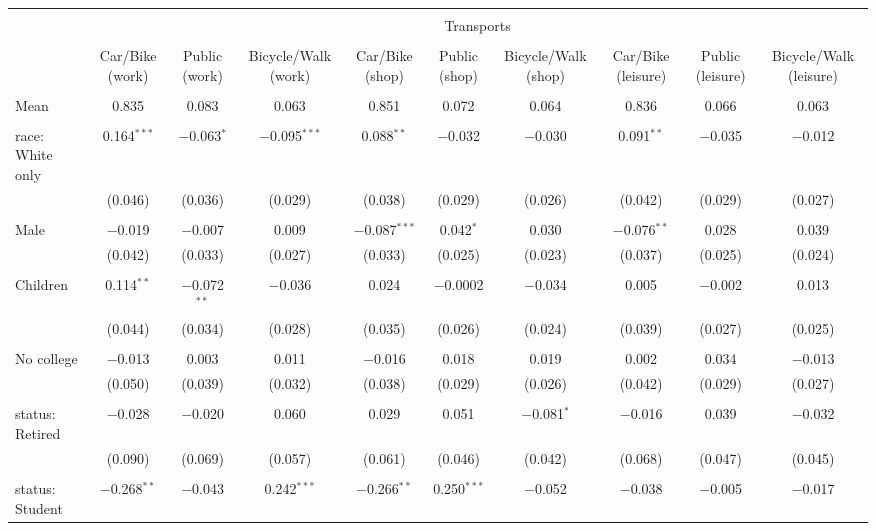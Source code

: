 
\begin{tabular}{@{\extracolsep{5pt}}lccccccccc} 
\\[-1.8ex]\hline 
\hline \\[-1.8ex] 
 & \multicolumn{9}{c}{Transports} \\ 
\cline{2-10} 
\\[-1.8ex] & Car/Bike (work) & Public (work) & Bicycle/Walk (work) & Car/Bike (shop) & Public (shop) & Bicycle/Walk (shop) & Car/Bike (leisure) & Public (leisure) & Bicycle/Walk (leisure) \\ 
\hline \\[-1.8ex] 
 Mean & 0.835 & 0.083 & 0.063 & 0.851 & 0.072 & 0.064 & 0.836 & 0.066 & 0.063  \\ \hline \\[-1.8ex] race: White only & 0.164$^{***}$ & $-$0.063$^{*}$ & $-$0.095$^{***}$ & 0.088$^{**}$ & $-$0.032 & $-$0.030 & 0.091$^{**}$ & $-$0.035 & $-$0.012 \\ 
  & (0.046) & (0.036) & (0.029) & (0.038) & (0.029) & (0.026) & (0.042) & (0.029) & (0.027) \\ 
  & & & & & & & & & \\ 
 Male & $-$0.019 & $-$0.007 & 0.009 & $-$0.087$^{***}$ & 0.042$^{*}$ & 0.030 & $-$0.076$^{**}$ & 0.028 & 0.039 \\ 
  & (0.042) & (0.033) & (0.027) & (0.033) & (0.025) & (0.023) & (0.037) & (0.025) & (0.024) \\ 
  & & & & & & & & & \\ 
 Children & 0.114$^{**}$ & $-$0.072$^{**}$ & $-$0.036 & 0.024 & $-$0.0002 & $-$0.034 & 0.005 & $-$0.002 & 0.013 \\ 
  & (0.044) & (0.034) & (0.028) & (0.035) & (0.026) & (0.024) & (0.039) & (0.027) & (0.025) \\ 
  & & & & & & & & & \\ 
 No college & $-$0.013 & 0.003 & 0.011 & $-$0.016 & 0.018 & 0.019 & 0.002 & 0.034 & $-$0.013 \\ 
  & (0.050) & (0.039) & (0.032) & (0.038) & (0.029) & (0.026) & (0.042) & (0.029) & (0.027) \\ 
  & & & & & & & & & \\ 
 status: Retired & $-$0.028 & $-$0.020 & 0.060 & 0.029 & 0.051 & $-$0.081$^{*}$ & $-$0.016 & 0.039 & $-$0.032 \\ 
  & (0.090) & (0.069) & (0.057) & (0.061) & (0.046) & (0.042) & (0.068) & (0.047) & (0.045) \\ 
  & & & & & & & & & \\ 
 status: Student & $-$0.268$^{**}$ & $-$0.043 & 0.242$^{***}$ & $-$0.266$^{**}$ & 0.250$^{***}$ & $-$0.052 & $-$0.038 & $-$0.005 & $-$0.017 \\ 

\end{tabular}
